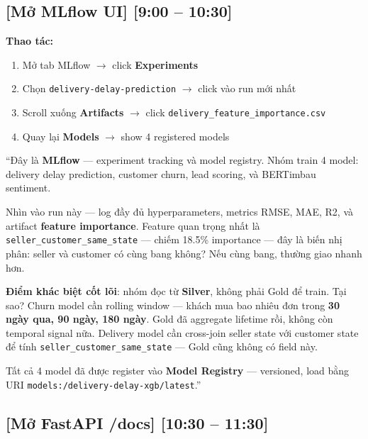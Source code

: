 \documentclass[12pt, a4paper]{article}
\newenvironment{speakerbox}[2]{%
  \begin{tcolorbox}[
    enhanced, breakable,
    colback=#1!6!white,
    colframe=#1,
    colbacktitle=#1,
    coltitle=white,
    fonttitle=\bfseries\large,
    title={#2},
    arc=4pt,
    boxrule=1.5pt,
    left=8pt, right=8pt, top=6pt, bottom=6pt,
  ]
}{%
  \end{tcolorbox}
}
\newcommand{\timing}[1]{%
  \hfill{\small\bfseries\color{gray}[#1]}%
}
\begin{document}
\begin{speakerbox}{p4color}{\faUser\ Người 4 · 9:00 -- 15:00}

\subsection*{[Mở MLflow UI] \timing{9:00 -- 10:30}}

\begin{demobox}
\textbf{Thao tác:}
\begin{enumerate}[leftmargin=1.5em, itemsep=2pt]
  \item Mở tab MLflow $\to$ click \textbf{Experiments}
  \item Chọn \texttt{delivery-delay-prediction} $\to$ click vào run mới nhất
  \item Scroll xuống \textbf{Artifacts} $\to$ click \texttt{delivery\_feature\_importance.csv}
  \item Quay lại \textbf{Models} $\to$ show 4 registered models
\end{enumerate}
\end{demobox}

\begin{scriptbox}
``Đây là \textbf{MLflow} --- experiment tracking và model registry. Nhóm train 4 model:
delivery delay prediction, customer churn, lead scoring, và BERTimbau sentiment.

Nhìn vào run này --- log đầy đủ hyperparameters, metrics RMSE, MAE, R2, và
artifact \textbf{feature importance}. Feature quan trọng nhất là \texttt{seller\_customer\_same\_state}
--- chiếm 18.5\% importance --- đây là biến nhị phân: seller và customer có cùng
bang không? Nếu cùng bang, thường giao nhanh hơn.

\textbf{Điểm khác biệt cốt lõi}: nhóm đọc từ \textbf{Silver}, không phải Gold để train.
Tại sao? Churn model cần rolling window --- khách mua bao nhiêu đơn trong
\textbf{30 ngày qua, 90 ngày, 180 ngày}. Gold đã aggregate lifetime rồi, không còn
temporal signal nữa. Delivery model cần cross-join seller state với customer state để
tính \texttt{seller\_customer\_same\_state} --- Gold cũng không có field này.

Tất cả 4 model đã được register vào \textbf{Model Registry} --- versioned,
load bằng URI \texttt{models:/delivery-delay-xgb/latest}.''
\end{scriptbox}

\subsection*{[Mở FastAPI /docs] \timing{10:30 -- 11:30}}


\end{speakerbox}
\end{document}
